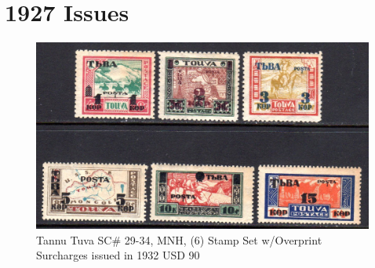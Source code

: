 \section{1927 Issues}

\begin{fullwidth}
\begin{figure}[htp]
\includegraphics[width=.95\textwidth]{../tannu-tuva/29-34.jpg}
\caption{Tannu Tuva SC\# 29-34, MNH, (6) Stamp Set w/Overprint Surcharges issued in 1932 USD 90 }
\end{figure}
\end{fullwidth}






                                                